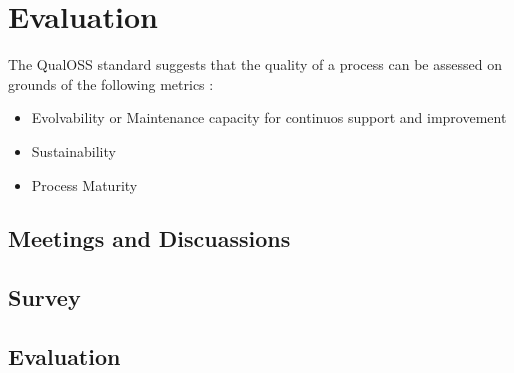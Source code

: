 \chapter{Evaluation}\label{chapter:Evaluation}
\indent The QualOSS standard suggests that the quality of a process can be assessed on grounds of the following metrics :
\begin{itemize}
\item Evolvability or Maintenance capacity for continuos support and improvement
\item Sustainability 
\item Process Maturity
\end{itemize}

\section{Meetings and Discuassions}
\section{Survey}
\section{Evaluation}